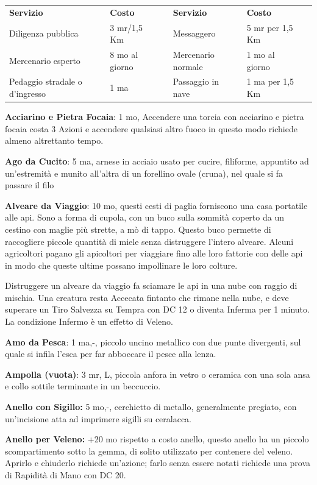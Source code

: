 \documentclass[a4paper,11pt,twoside,openany]{book}
\begin{document}
\begin{tabularx}{\textwidth}{XllXll}
	\textbf{Servizio} & \textbf{Costo} & & \textbf{Servizio} & \textbf{Costo}  & \\
	Diligenza pubblica& 3 mr/1,5 Km    & & Messaggero  & 5 mr per 1,5 Km & \\
	Mercenario esperto& 8 mo al giorno & & Mercenario normale& 1 mo al giorno  & \\
	Pedaggio stradale o d’ingresso& 1 ma& & Passaggio in nave & 1 ma per 1,5 Km & \\
\end{tabularx}

\bigskip


\textbf{Acciarino e Pietra Focaia}: 1 mo, Accendere una torcia con acciarino e pietra focaia costa 3 Azioni e accendere qualsiasi altro fuoco in questo modo richiede almeno altrettanto tempo.

\textbf{Ago da Cucito}: 5 ma, arnese in acciaio usato per cucire, filiforme, appuntito ad un'estremità e munito all'altra di un forellino ovale (cruna), nel quale si fa passare il filo

\textbf{Alveare da Viaggio}: 10 mo, questi cesti di paglia forniscono una casa portatile alle api. Sono a forma di cupola, con un buco sulla sommità coperto da un cestino con maglie più strette, a mò di tappo. Questo buco permette di raccogliere piccole quantità di miele senza distruggere l'intero alveare. Alcuni agricoltori pagano gli apicoltori per viaggiare fino alle loro fattorie con delle api in modo che queste ultime possano impollinare le loro colture.

Distruggere un alveare da viaggio fa sciamare le api in una nube con raggio di mischia. Una creatura resta Accecata fintanto che rimane nella nube, e deve superare un Tiro Salvezza su Tempra con DC 12 o diventa Inferma per 1 minuto. La condizione Infermo è un effetto di Veleno.

\textbf{Amo da Pesca}: 1 ma,-, piccolo uncino metallico con due punte divergenti, sul quale si infila l'esca per far abboccare il pesce alla lenza.

\textbf{Ampolla (vuota)}: 3 mr, L, piccola anfora in vetro o ceramica con una sola ansa e collo sottile terminante in un beccuccio.

\textbf{Anello con Sigillo:} 5 mo,-, cerchietto di metallo, generalmente pregiato, con un'incisione atta ad imprimere sigilli su ceralacca.

\textbf{Anello per Veleno:} +20 mo rispetto a costo anello, questo anello ha un piccolo scompartimento sotto la gemma, di solito utilizzato per contenere del veleno. Aprirlo e chiuderlo richiede un'azione; farlo senza essere notati richiede una prova di Rapidità di Mano con DC 20.
\end{document}
